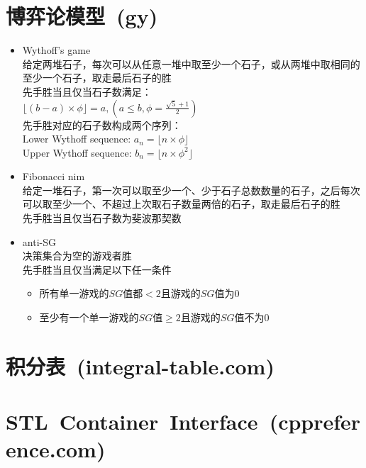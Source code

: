 \section{博弈论模型\ \small(gy)}
	\begin{itemize}
		\item Wythoff's game
			\\给定两堆石子，每次可以从任意一堆中取至少一个石子，或从两堆中取相同的至少一个石子，取走最后石子的胜
			\\先手胜当且仅当石子数满足：
			\\$\lfloor (b - a) \times \phi \rfloor=a, (a \leq b, \phi = \frac{\sqrt{5} + 1}{2})$
			\\先手胜对应的石子数构成两个序列：
			\\Lower Wythoff sequence: $a_n = \lfloor n \times \phi \rfloor$
			\\Upper Wythoff sequence: $b_n = \lfloor n \times \phi ^ 2 \rfloor$
		\item Fibonacci nim
			\\给定一堆石子，第一次可以取至少一个、少于石子总数数量的石子，之后每次可以取至少一个、不超过上次取石子数量两倍的石子，取走最后石子的胜
			\\先手胜当且仅当石子数为斐波那契数
		\item anti-SG
			\\决策集合为空的游戏者胜
			\\先手胜当且仅当满足以下任一条件
			\begin{itemize}[nosep]
				\item 所有单一游戏的$ SG $值都$ < 2 $且游戏的$ SG $值为$ 0 $
				\item 至少有一个单一游戏的$ SG $值$ \geq 2 $且游戏的$ SG $值不为$ 0 $
			\end{itemize}
	\end{itemize}
\section{积分表\ \small(integral-table.com)}
	\begin{multicols}{2}
		
	\end{multicols}
\section{STL\ Container\ Interface\ \small(cppreference.com)}
	\ifodd\thepage
		
	\else
		
	\fi
